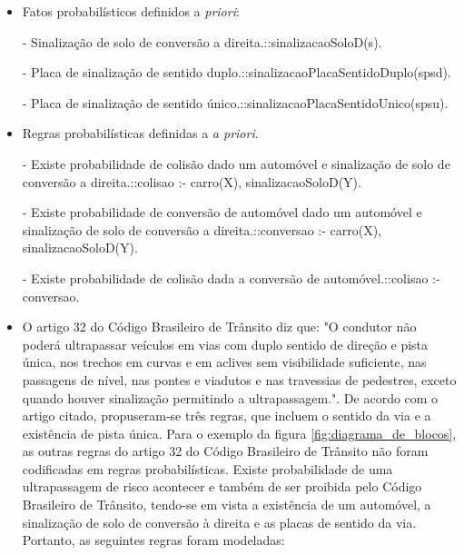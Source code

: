 \documentclass[
	12pt,				%
    oneside,			%
	a4paper,			%
	english,			%
	french,				%
	spanish,			%
	brazil,				%
	]{abntex2}
\begin{document}
\begin{enumerate}
\begin{itemize}
            \item Fatos probabilísticos definidos a \textit{priori}:\newline
            
            - Sinalização de solo de conversão a direita.::sinalizacaoSoloD(s).\newline

            - Placa de sinalização de sentido duplo.::sinalizacaoPlacaSentidoDuplo(spsd).\newline
            
            - Placa de sinalização de sentido único.::sinalizacaoPlacaSentidoUnico(spsu).\newline

            \item Regras probabilísticas definidas a \textit{a priori}.\newline


            - Existe probabilidade de colisão dado um automóvel e sinalização de solo de conversão a direita.::colisao :- carro(X), sinalizacaoSoloD(Y).\newline
            
            - Existe probabilidade de conversão de automóvel dado um automóvel e sinalização de solo de conversão a direita.::conversao :- carro(X), sinalizacaoSoloD(Y).\newline
            
            - Existe probabilidade de colisão dada a conversão de automóvel.::colisao :- conversao.\newline

           \item O artigo 32 do Código Brasileiro de Trânsito diz que: "O condutor não poderá ultrapassar veículos em vias com duplo sentido de direção e pista única, nos trechos em curvas e em aclives sem visibilidade suficiente, nas passagens de nível, nas pontes e viadutos e nas travessias de pedestres, exceto quando houver sinalização permitindo a ultrapassagem.". De acordo com o artigo citado, propuseram-se três regras, que incluem o sentido da via e a existência de pista única. Para o exemplo da figura  \ref{fig:diagrama_de_blocos}, as outras regras do artigo 32 do Código Brasileiro de Trânsito não foram codificadas em regras probabilísticas. Existe probabilidade de uma ultrapassagem de risco acontecer e também de ser proibida pelo Código Brasileiro de Trânsito, tendo-se em vista a existência de um automóvel, a sinalização de solo de conversão à direita e as placas de sentido da via. Portanto, as seguintes regras foram modeladas:\newline
           

\end{itemize}
\end{enumerate}
\end{document}
